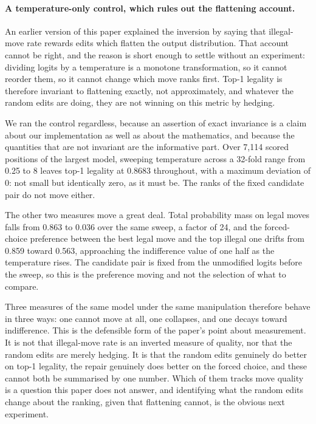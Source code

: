 \documentclass[11pt]{article}
\begin{document}

\paragraph{A temperature-only control, which rules out the flattening account.}
An earlier version of this paper explained the inversion by saying that illegal-move
rate rewards edits which flatten the output distribution. That account cannot be
right, and the reason is short enough to settle without an experiment: dividing
logits by a temperature is a monotone transformation, so it cannot reorder them, so it
cannot change which move ranks first. Top-1 legality is therefore invariant to
flattening exactly, not approximately, and whatever the random edits are doing, they
are not winning on this metric by hedging.

We ran the control regardless, because an assertion of exact invariance is a claim
about our implementation as well as about the mathematics, and because the quantities
that are not invariant are the informative part. Over 7,114 scored positions
of the largest model, sweeping temperature across a 32-fold range from
0.25 to 8 leaves top-1 legality at 0.8683 throughout, with a maximum
deviation of 0: not small but identically zero, as it must be. The ranks of
the fixed candidate pair do not move either.

The other two measures move a great deal. Total probability mass on legal moves falls
from 0.863 to 0.036 over the same sweep, a factor of 24, and the
forced-choice preference between the best legal move and the top illegal one drifts
from 0.859 toward 0.563, approaching the indifference value of one half as
the temperature rises. The candidate pair is fixed from the unmodified logits before
the sweep, so this is the preference moving and not the selection of what to compare.

Three measures of the same model under the same manipulation therefore behave in three
ways: one cannot move at all, one collapses, and one decays toward indifference. This
is the defensible form of the paper's point about measurement. It is not that
illegal-move rate is an inverted measure of quality, nor that the random edits are
merely hedging. It is that the random edits genuinely do better on top-1 legality,
the repair genuinely does better on the forced choice, and these cannot both be
summarised by one number. Which of them tracks move quality is a question this paper
does not answer, and identifying what the random edits change about the ranking, given
that flattening cannot, is the obvious next experiment.
\end{document}
